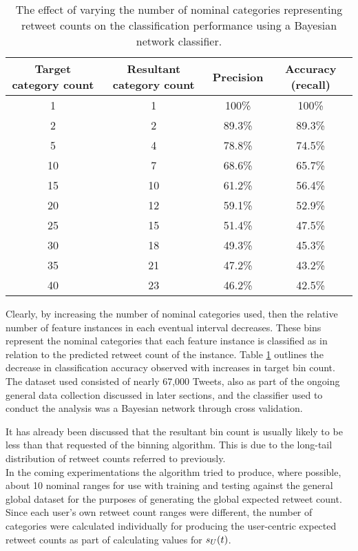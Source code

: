 \begin{table}[h]\footnotesize
\begin{center}
\begin{tabular}{ c | c | c | c }
	Target category count	& Resultant category count & Precision &  Accuracy (recall) \\
	\hline
	\hline 
    1 & 1 & 100\% & 100\% \\
    2 & 2 & 89.3\% & 89.3\% \\
    5 & 4 & 78.8\%  & 74.5\% \\
    10 & 7 & 68.6\% & 65.7\% \\
    15 & 10 & 61.2\% & 56.4\% \\
    20 & 12 & 59.1\% & 52.9\% \\
    25 & 15 & 51.4\% & 47.5\% \\
    30 & 18 & 49.3\% & 45.3\% \\
    35 & 21 & 47.2\% & 43.2\% \\
    40 & 23 & 46.2\% & 42.5\% \\
    \hline  
\end{tabular}
\end{center}
\caption{The effect of varying the number of nominal categories representing retweet counts on the classification performance using a Bayesian network classifier.}
\label{table:binperformance}
\end{table}

Clearly, by increasing the number of nominal categories used, then the relative number of feature instances in each eventual interval decreases. These bins represent the nominal categories that each feature instance is classified as in relation to the predicted retweet count of the instance. Table \ref{table:binperformance} outlines the decrease in classification accuracy observed with increases in target bin count. The dataset used consisted of nearly 67,000 Tweets, also as part of the ongoing general data collection discussed in later sections, and the classifier used to conduct the analysis was a Bayesian network through cross validation.

It has already been discussed that the resultant bin count is usually likely to be less than that requested of the binning algorithm. This is due to the long-tail distribution of retweet counts referred to previously.\\
In the coming experimentations the algorithm tried to produce, where possible, about 10 nominal ranges for use with training and testing against the general global dataset for the purposes of generating the global expected retweet count. Since each user's own retweet count ranges were different, the number of categories were calculated individually for producing the user-centric expected retweet counts as part of calculating values for $s_U(t)$.



